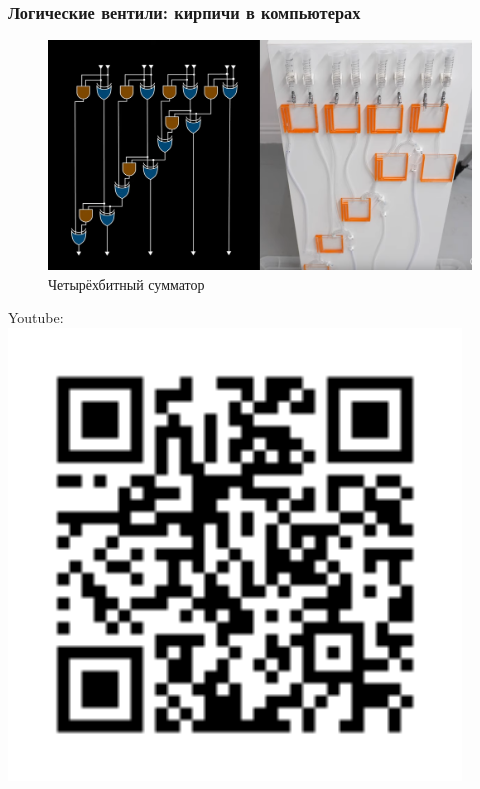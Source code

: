 \documentclass[t,aspectratio=169]{beamer}
\begin{document}
\begin{frame}
    \frametitle{Логические вентили: кирпичи в компьютерах}
    \begin{minipage}{0.85\textwidth}
        \begin{figure}
            \begin{centering}
                \includegraphics[height=0.7\textheight]{water-adder}
                \caption{Четырёхбитный сумматор}
            \end{centering}
        \end{figure}
    \end{minipage}
    \begin{minipage}{0.14\textwidth}
        Youtube:
        \includegraphics[width=0.9\textwidth]{water-adder-qr}
    \end{minipage}
\end{frame}
\end{document}
